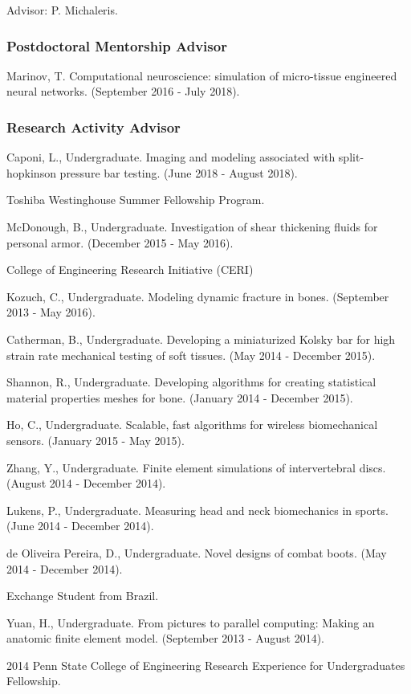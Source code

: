 \documentclass[a4paper,10pt]{article}
\begin{document}
Advisor: P. Michaleris.



\subsubsection*{Postdoctoral Mentorship Advisor}
Marinov, T. Computational neuroscience: simulation of micro-tissue engineered neural networks. (September 2016 - July 2018).



\subsubsection*{Research Activity Advisor}
Caponi, L., Undergraduate. Imaging and modeling associated with split-hopkinson pressure bar testing. (June 2018 - August 2018).

Toshiba Westinghouse Summer Fellowship Program.

McDonough, B., Undergraduate. Investigation of shear thickening fluids for personal armor. (December 2015 - May 2016).

College of Engineering Research Initiative (CERI)

Kozuch, C., Undergraduate. Modeling dynamic fracture in bones. (September 2013 - May 2016).

Catherman, B., Undergraduate. Developing a miniaturized Kolsky bar for high strain rate mechanical testing of soft tissues. (May 2014 - December 2015).

Shannon, R., Undergraduate. Developing algorithms for creating statistical material properties meshes for bone. (January 2014 - December 2015).

Ho, C., Undergraduate. Scalable, fast algorithms for wireless biomechanical sensors. (January 2015 - May 2015).

Zhang, Y., Undergraduate. Finite element simulations of intervertebral discs. (August 2014 - December 2014).

Lukens, P., Undergraduate. Measuring head and neck biomechanics in sports. (June 2014 - December 2014).

de Oliveira Pereira, D., Undergraduate. Novel designs of combat boots. (May 2014 - December 2014).

Exchange Student from Brazil.

Yuan, H., Undergraduate. From pictures to parallel computing: Making an anatomic finite element model. (September 2013 - August 2014).

2014 Penn State College of Engineering Research Experience for Undergraduates Fellowship.
\end{document}
